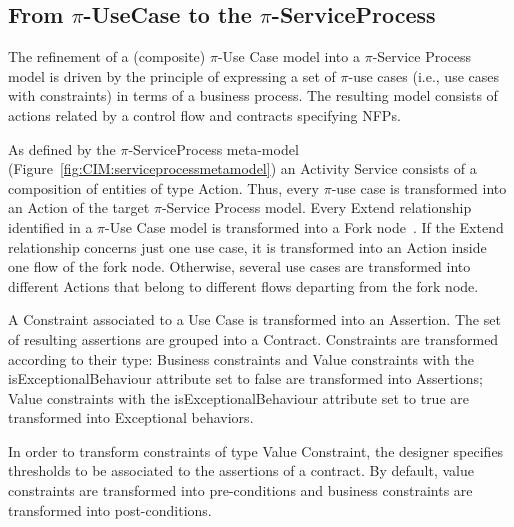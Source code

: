 \documentclass[12pt,twoside]{article}
\theoremstyle{plain}
\theoremstyle{plain}
\begin{document}
\begin{multicols}{2}
\subsection{From $\pi$-UseCase to the $\pi$-ServiceProcess}

The refinement of a (composite) $\pi$-Use Case model into a $\pi$-Service Process model is driven by the principle of expressing a set of $\pi$-use cases (i.e., use cases with constraints)   in terms of  a business process.
The resulting model consists of actions related by a control flow and contracts specifying NFPs. 

As defined by the $\pi$-ServiceProcess  meta-model (Figure~\ref{fig:CIM:serviceprocessmetamodel}) an {\sc Activity Service} consists of a composition of  entities of type {\sc Action}. 
Thus, every {\sf $\pi$-use case} is transformed into an {\sf Action} of the target $\pi$-Service Process model.  
Every {\sf Extend} relationship identified in a $\pi$-Use Case model is
transformed into a  {\sf Fork node}~\cite{valeriaThesis,placidoPhDThesis2012}.
If the {\sf Extend} relationship concerns just one {\sf use case}, it is transformed into an {\sf Action} inside one flow of the fork node. 
Otherwise, several  {\sf use cases} are transformed into different {\sf Actions} that belong to different flows departing from the fork node.   


A {\sf Constraint} associated to a {\sf Use Case}  is transformed into an  {\sf Assertion}.  
The set of resulting assertions  are grouped into a {\sf Contract}.
Constraints are transformed according to their type:
{\sc Business} constraints and {\sc Value} constraints with the {\sf  isExceptionalBehaviour} at\-tri\-bute set to false are transformed into {\sf Assertion}s;
{\sc Value } constraints with the {\sf  isExceptionalBehaviour} attribute set to true are transformed into {\sf Exceptional behavior}s.

In order to transform constraints of type {\sf Value Constraint}, the designer specifies thresholds to be associated to the assertions of a contract.
By default, value constraints are transformed into pre-conditions and business constraints are transformed into post-conditions. 
  

\end{multicols}
\end{document}
